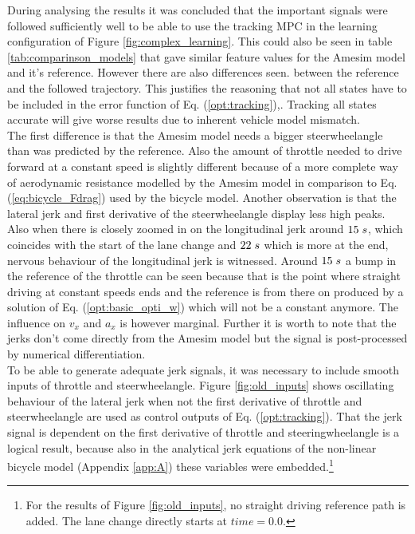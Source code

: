 During analysing the results it was concluded that the important signals were followed sufficiently well to be able to use the tracking MPC in the learning configuration of Figure \ref{fig:complex_learning}. This could also be seen in table \ref{tab:comparinson_models} that gave similar feature values for the Amesim model and it's reference. However there are also differences seen. between the reference and the followed trajectory. This justifies the reasoning that not all states have to be included in the error function of Eq. (\ref{opt:tracking}),. Tracking all states accurate will give worse results due to inherent vehicle model mismatch.\\ The first difference is that the Amesim model needs a bigger steerwheelangle than was predicted by the reference. Also the amount of throttle needed to drive forward at a constant speed is slightly different because of a more complete way of aerodynamic resistance modelled by the Amesim model in comparison to Eq. (\ref{eq:bicycle_Fdrag}) used by the bicycle model.
Another observation is that the lateral jerk and first derivative of the steerwheelangle display less high peaks. Also when there is closely zoomed in on the longitudinal jerk around $15\hspace{1mm}s$, which coincides with the start of the lane change and $22\hspace{1mm}s$ which is more at the end, nervous behaviour of the longitudinal jerk is witnessed. Around $15\hspace{1mm}s$ a bump in the reference of the throttle can be seen because that is the point where straight driving at constant speeds ends and the reference is from there on produced by a solution of Eq. (\ref{opt:basic_opti_w}) which will not be a constant anymore. The influence on $v_x$ and $a_x$ is however marginal. Further it is worth to note that the jerks don't come directly from the Amesim model but the signal is post-processed by numerical differentiation. \\

To be able to generate adequate jerk signals, it was necessary to include smooth inputs of throttle and steerwheelangle. Figure \ref{fig:old_inputs} shows oscillating behaviour of the lateral jerk when not the first derivative of throttle and steerwheelangle are used as control outputs of Eq. (\ref{opt:tracking}). That the jerk signal is dependent on the first derivative of throttle and steeringwheelangle is a logical result, because also in the analytical jerk equations of the non-linear bicycle model (Appendix \ref{app:A}) these variables were embedded.\footnote{For the results of Figure \ref{fig:old_inputs}, no straight driving reference path is added. The lane change directly starts at $time = 0.0$.}

